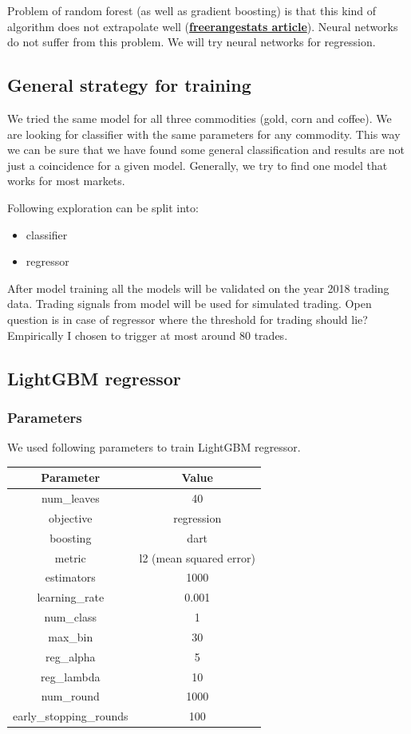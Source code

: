 \documentclass[final,2p]{elsarticle}
\begin{document}
Problem of random forest (as well as gradient boosting) is that this kind of algorithm does not extrapolate well (\href{http://freerangestats.info/blog/2016/12/10/extrapolation}{\textbf{freerangestats article}}).
Neural networks do not suffer from this problem. We will try neural networks for regression.

\subsection{General strategy for training}
We tried the same model for all three commodities (gold, corn and coffee). We are looking for classifier with the same parameters for any commodity. This way we can be sure that we have found some general classification and results are not just a coincidence for a given model.
Generally, we try to find one model that works for most markets.

Following exploration can be split into:

\begin{itemize}
    \item classifier
    \item regressor
\end{itemize}

After model training all the models will be validated on the year 2018 trading data. Trading signals from model will be used for simulated trading. Open question is in case of regressor where the threshold for trading should lie?
Empirically I chosen to trigger at most around $80$ trades.

\subsection{LightGBM regressor}

\subsubsection{Parameters}
We used following parameters to train LightGBM regressor. 

\begin{center}
\begin{tabular}{cc}
    Parameter & Value \\
    \hline
    num\_leaves & 40 \\
    objective & regression \\
    boosting & dart \\
    metric & l2 (mean squared error) \\
    estimators & 1000 \\
    learning\_rate & 0.001 \\
    num\_class & 1 \\
    max\_bin & 30 \\
    reg\_alpha & 5 \\
    reg\_lambda & 10 \\
    num\_round & 1000 \\
    early\_stopping\_rounds & 100 \\
\end{tabular}
\end{center}
\end{document}
